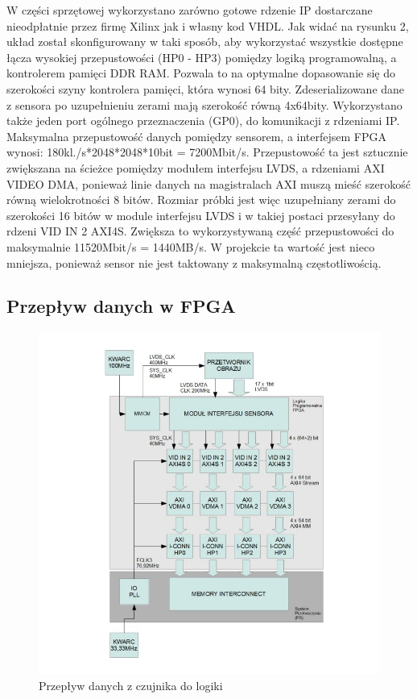 \documentclass[a4paper,11pt,oneside]{book}  %
\begin{document}
W części sprzętowej wykorzystano zarówno gotowe rdzenie IP dostarczane nieodpłatnie przez firmę Xilinx jak i własny kod VHDL. Jak widać na rysunku 2, układ został skonfigurowany w taki sposób, aby wykorzystać wszystkie dostępne łącza wysokiej przepustowości (HP0 - HP3) pomiędzy logiką programowalną, a kontrolerem pamięci DDR RAM. Pozwala to na optymalne dopasowanie się do szerokości szyny kontrolera pamięci, która wynosi 64 bity. Zdeserializowane dane z sensora po uzupełnieniu zerami mają szerokość równą 4x64bity. Wykorzystano także jeden port ogólnego przeznaczenia (GP0), do komunikacji z rdzeniami IP. Maksymalna przepustowość danych pomiędzy sensorem, a interfejsem FPGA wynosi: 180kl./s*2048*2048*10bit = 7200Mbit/s. Przepustowość ta jest sztucznie zwiększana na ścieżce pomiędzy modułem interfejsu LVDS, a rdzeniami AXI VIDEO DMA, ponieważ linie danych na magistralach AXI muszą mieść szerokość równą wielokrotności 8 bitów. Rozmiar próbki jest więc uzupełniany zerami do szerokości 16 bitów w module interfejsu LVDS i w takiej postaci przesyłany do rdzeni VID IN 2 AXI4S. Zwiększa to wykorzystywaną część przepustowości do maksymalnie 11520Mbit/s = 1440MB/s. W projekcie ta wartość jest nieco mniejsza, ponieważ sensor nie jest taktowany z maksymalną częstotliwością.

\subsection{Przepływ danych w FPGA}
\begin{figure}[H]
	\centering
	\includegraphics[width=14cm]{data.png}
	\caption{Przepływ danych z czujnika do logiki}
	\label{fig:Zynq2}
\end{figure}
 
\end{document}
